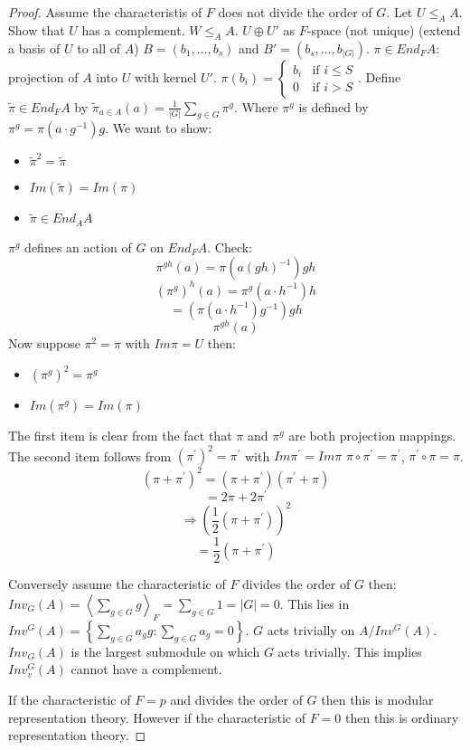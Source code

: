 \documentclass[12pt]{amsart}
\theoremstyle{definition}
\begin{document}
\begin{proof}
Assume the characteristis of $F$ does not divide the order of $G$. Let $U \leq_{A} A$. Show that $U$ has a complement. $W \leq_{A} A$. $U \oplus U'$ as $F$-space (not unique) (extend a basis of $U$ to all of $A$) $B = \left(b_{1}, \ldots, b_{s} \right)$ and $B' = \left( b_{s}, \ldots, b_{\left| G \right|} \right)$. $\pi \in End_{F} A$: projection of $A$ into $U$ with kernel $U'$.
$\pi \left( b_{i} \right) =
\begin{cases}
b_{i} & \mbox{if } i \leq S\\
0 & \mbox{if } i > S
\end{cases}$.
Define $\widetilde{\pi} \in End_{F} A$ by $\widetilde{\pi}_{a \in A} (a) = \frac{1}{\left| G \right|} \sum_{g \in G} \pi^{g}$. Where $\pi^{g}$ is defined by $\pi^{g} = \pi \left( a \cdot g^{-1} \right)g$. We want to show:
\begin{itemize}
\item $\widetilde{\pi}^{2} = \widetilde{\pi}$
\item $Im(\widetilde{\pi}) = Im( \pi)$
\item $\widetilde{\pi} \in End_{A} A$
\end{itemize}
$\pi^{g}$ defines an action of $G$ on $End_{F} A$. Check:
$$\pi^{gh} (a) = \pi \left( a \left( gh \right)^{-1} \right) gh$$
$$\left( \pi^{g} \right)^{h} (a) = \pi^{g} \left(a \cdot h^{-1} \right) h$$
$$ = \left( \pi \left( a \cdot h^{-1} \right) g^{-1} \right) gh$$
$$ \pi^{gh} (a)$$
Now suppose $\pi^{2} = \pi$ with $Im \pi = U$ then:
\begin{itemize}
\item $\left( \pi^{g} \right)^{2} = \pi^{g}$
\item  $Im( \pi^{g} ) = Im (\pi)$
\end{itemize}
The first item is clear from the fact that $\pi$ and $\pi^{g}$ are both projection mappings.
The second item follows from $ \left( \pi^{'} \right)^{2} = \pi^{'}$ with $Im \pi^{'} = Im \pi$
$\pi \circ \pi^{'} = \pi^{'}$, $\pi^{'} \circ \pi = \pi$.
$$(\pi + \pi^{'} )^{2} = (\pi + \pi^{'} ) (\pi^{'} + \pi)$$
$$ = 2 \pi + 2 \pi^{'}$$
$$\Rightarrow \left( \frac{1}{2} \left( \pi + \pi^{'} \right) \right)^{2}$$
$$ = \frac{1}{2} \left( \pi + \pi^{'} \right)$$

Conversely assume the characteristic of $F$ divides the order of $G$ then:
$Inv_{G} (A) = \left\langle \sum_{g \in G} g \right\rangle_{F} = \sum_{g \in G} 1 = \left| G \right| = 0$. This lies in $Inv^{G} (A) = \left\{ \sum_{g \in G} a_{g} g : \sum_{g \in G} a_{g} = 0 \right\}$. $G$ acts trivially on $A/ Inv^{G} (A)$. $Inv_{G} (A)$ is the largest submodule on which $G$ acts trivially. This implies $Inv^{G}_{v} (A)$ cannot have a complement.

If the characteristic of $F = p$ and divides the order of $G$ then this is modular representation theory. However if the characteristic of $F = 0$ then this is ordinary representation theory.
\end{proof}
\end{document}
